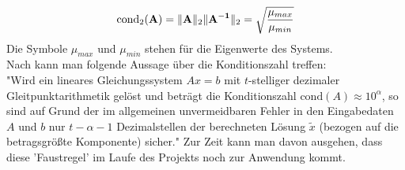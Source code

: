 {$$ 
\text{cond}_2(\mathbf{A}) = \lVert \mathbf{A} \rVert_2 \lVert \mathbf{A^{-1}} \rVert_2=
\sqrt{\frac{\mu_{max}}{\mu_{min}}}\\
$$
Die Symbole $\mu_{max}$ und $\mu_{min}$ stehen für die Eigenwerte des Systems.\\
Nach \cite{hermann2001numerische} kann man folgende Aussage über die Konditionszahl treffen:\\
"Wird ein lineares Gleichungssystem $Ax=b$ mit $t$-stelliger dezimaler Gleitpunktarithmetik gelöst und beträgt die Konditionszahl $\text{cond}(A) \approx10^\alpha$, so sind auf Grund der im allgemeinen unvermeidbaren Fehler in den Eingabedaten $A$ und $b$ nur $t-\alpha-1$ Dezimalstellen der berechneten Lösung $\tilde{x}$ (bezogen auf die betragsgrößte Komponente) sicher."
Zur Zeit kann man davon ausgehen, dass diese 'Faustregel' im Laufe des Projekts noch zur Anwendung kommt.

}